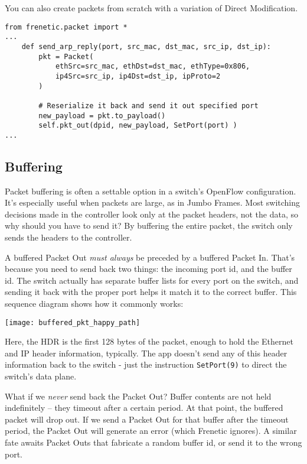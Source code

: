 You can also create packets from scratch with a variation of Direct Modification.  

\begin{verbatim}
from frenetic.packet import *
...
    def send_arp_reply(port, src_mac, dst_mac, src_ip, dst_ip):
        pkt = Packet(
            ethSrc=src_mac, ethDst=dst_mac, ethType=0x806,
            ip4Src=src_ip, ip4Dst=dst_ip, ipProto=2
        )

        # Reserialize it back and send it out specified port
        new_payload = pkt.to_payload()
        self.pkt_out(dpid, new_payload, SetPort(port) )  
...
\end{verbatim}

\subsection{Buffering}
\label{intro:buffering}

Packet buffering is often a settable option in a switch's OpenFlow configuration.  It's 
especially useful when packets are large, as in Jumbo Frames.  Most switching decisions made in 
the controller look only at the packet headers, not the data, so why should you have to send it?  By buffering the
entire packet, the switch only sends the headers to the controller.  

A buffered Packet Out \emph{must always} be preceded by a buffered Packet In.  That's because you need 
to send back two things:
the incoming port id, and the buffer id.  The switch actually has separate buffer lists 
for every port on the switch, and 
sending it back with the proper port helps it match it to the correct buffer.   
This sequence diagram shows how it commonly works:

\texttt{[image: buffered\_pkt\_happy\_path]}

Here, the HDR is the first 128 bytes of the packet, enough to hold the Ethernet and IP header information,
typically.  The app doesn't send any of this header information back to the switch - just the instruction
\texttt{SetPort(9)} to direct the switch's data plane.

What if we \emph{never} send back the Packet Out?  Buffer contents are not held indefinitely -- they timeout after a 
certain period.  At that point, the buffered packet will drop out.
If we send a Packet Out for that buffer after the timeout period, the Packet Out will generate an error (which
Frenetic ignores).    A similar fate awaits Packet Outs that fabricate a random buffer id, or send it to the
wrong port.  

